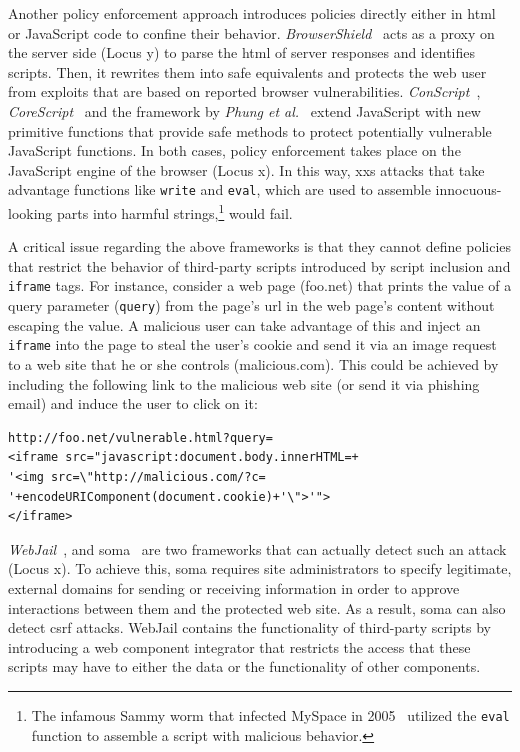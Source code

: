 \documentclass[conference]{IEEEtran}
\begin{document}
Another policy enforcement approach introduces
policies directly either in {\sc html} or JavaScript code
to confine their behavior. {\it BrowserShield}~\cite{RDWDE07}
acts as a proxy on the server side (Locus {\sc y}) to
parse the {\sc html} of server responses and identifies
scripts. Then, it rewrites them into safe equivalents
and protects the web user from exploits
that are based on reported browser vulnerabilities.
{\it ConScript}~\cite{ML10}, {\it CoreScript}~\cite{YCIS07}
and the framework by {\it Phung et al.}~\cite{PSC09}
extend JavaScript with new primitive functions that
provide safe methods to protect potentially vulnerable
JavaScript functions. In both cases, policy enforcement takes
place on the JavaScript engine of the browser (Locus {\sc x}).
In this way, {\sc xxs} attacks that take advantage
functions like {\tt write} and {\tt eval}, which are
used to assemble innocuous-looking parts into harmful
strings,\footnote{The infamous Sammy worm that
infected MySpace in 2005~\cite{SP07,ELX07}
utilized the {\tt eval} function to assemble a
script with malicious behavior.} would fail.

A critical issue regarding
the above frameworks is that they cannot
define policies that restrict the behavior of third-party
scripts introduced by script inclusion and {\tt iframe}
tags. For instance, consider a web page (foo.net)
that prints the value of a query parameter ({\tt query})
from the page's {\sc url} in the web page's content
without escaping the value. A malicious user
can take advantage of this and inject an {\tt iframe}
into the page to steal the user's cookie and
send it via an image request to a web site
that he or she controls (malicious.com).
This could be achieved by including the following
link to the malicious web site (or send it via phishing
email) and induce the user to click on it:

\lstset{language=VBScript, basicstyle=\footnotesize\ttfamily,}
\begin{lstlisting}
http://foo.net/vulnerable.html?query=
<iframe src="javascript:document.body.innerHTML=+
'<img src=\"http://malicious.com/?c=
'+encodeURIComponent(document.cookie)+'\">'">
</iframe>
\end{lstlisting}

\noindent
{\it WebJail}~\cite{VDDPJ11}, and
{\sc soma}~\cite{OWVS08} are two frameworks that
can actually detect such an attack (Locus {\sc x}).
To achieve this, {\sc soma} requires site administrators
to specify legitimate, external domains for sending
or receiving information in order to approve interactions
between them and the protected web site. As a result,
{\sc soma} can also detect {\sc csrf} attacks.
WebJail contains the functionality of third-party scripts
by introducing a web component integrator that restricts
the access that these scripts may have to either the data
or the functionality of other components.
\end{document}
